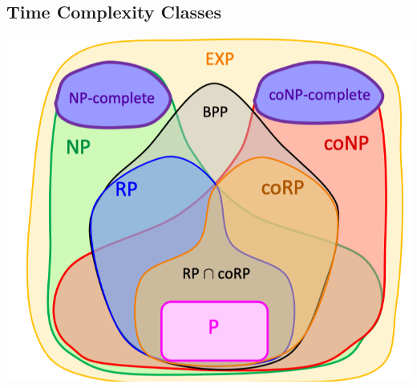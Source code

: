 \documentclass[10pt,landscape,a4paper]{article}
\begin{document}
\begin{multicols*}{3}
\subsection{Time Complexity Classes}

\includegraphics[scale=0.3]{time_complexity}


\end{multicols*}
\end{document}
